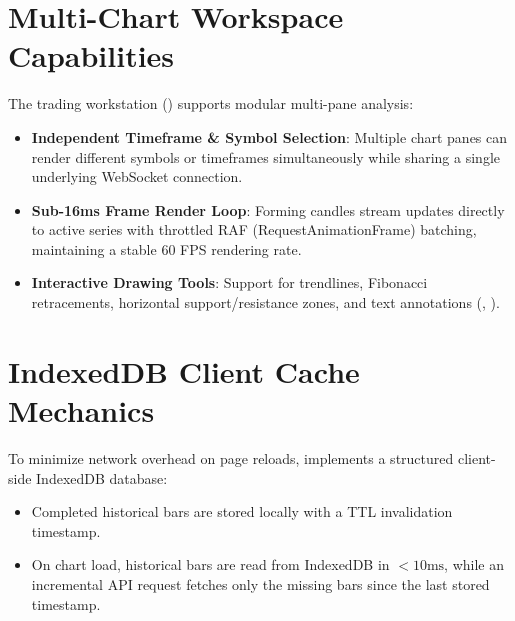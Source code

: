\section{Multi-Chart Workspace Capabilities}
The trading workstation () supports modular multi-pane analysis:
\begin{itemize}[leftmargin=6mm,itemsep=1.5mm]
    \item \textbf{Independent Timeframe \& Symbol Selection}: Multiple chart panes can render different symbols or timeframes simultaneously while sharing a single underlying WebSocket connection.
    \item \textbf{Sub-16ms Frame Render Loop}: Forming candles stream updates directly to active series with throttled RAF (RequestAnimationFrame) batching, maintaining a stable 60 FPS rendering rate.
    \item \textbf{Interactive Drawing Tools}: Support for trendlines, Fibonacci retracements, horizontal support/resistance zones, and text annotations (, ).
\end{itemize}

\section{IndexedDB Client Cache Mechanics}
To minimize network overhead on page reloads,  implements a structured client-side IndexedDB database:
\begin{itemize}[leftmargin=6mm,itemsep=1.5mm]
    \item Completed historical bars are stored locally with a TTL invalidation timestamp.
    \item On chart load, historical bars are read from IndexedDB in $<10\text{ms}$, while an incremental API request fetches only the missing bars since the last stored timestamp.
\end{itemize}
